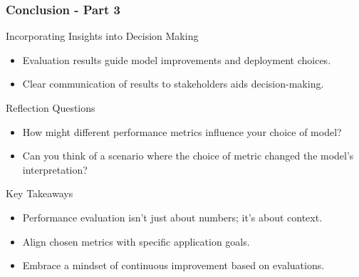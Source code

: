 \documentclass[aspectratio=169]{beamer}
\begin{document}
\begin{frame}[fragile]
    \frametitle{Conclusion - Part 3}
    \begin{block}{Incorporating Insights into Decision Making}
        \begin{itemize}
            \item Evaluation results guide model improvements and deployment choices.
            \item Clear communication of results to stakeholders aids decision-making.
        \end{itemize}
    \end{block}
    
    \begin{block}{Reflection Questions}
        \begin{itemize}
            \item How might different performance metrics influence your choice of model? 
            \item Can you think of a scenario where the choice of metric changed the model's interpretation?
        \end{itemize}
    \end{block}
    
    \begin{block}{Key Takeaways}
        \begin{itemize}
            \item Performance evaluation isn't just about numbers; it’s about context.
            \item Align chosen metrics with specific application goals.
            \item Embrace a mindset of continuous improvement based on evaluations.
        \end{itemize}
    \end{block}
\end{frame}
\end{document}
